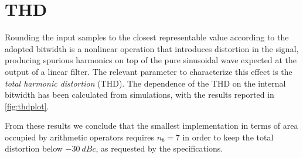 \section{THD}
Rounding the input samples to the closest representable value according to the adopted bitwidth is a nonlinear operation that introduces distortion in the signal, producing spurious harmonics on top of the pure sinusoidal wave expected at the output of a linear filter. The relevant parameter to characterize this effect is the \textit{total harmonic distortion} (THD). The dependence of the THD on the internal bitwidth has been calculated from simulations, with the results reported in \autoref{fig:thdplot}.


From these results we conclude that the smallest implementation in terms of area occupied by arithmetic operators requires $n_b=7$ in order to keep the total distortion below $\SI{-30}{dBc}$, as requested by the specifications.
